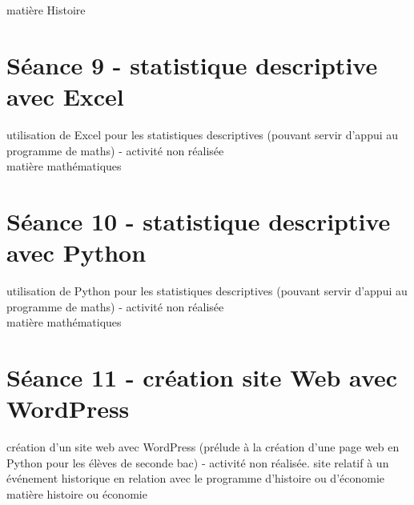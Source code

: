 \documentclass{moncours}
\begin{document}
matière Histoire


\section{Séance 9 - statistique descriptive avec Excel}

utilisation de Excel pour les statistiques descriptives (pouvant servir d'appui au programme de maths) - activité non réalisée\\

matière mathématiques

\section{Séance 10 - statistique descriptive avec Python}

utilisation de Python pour les statistiques descriptives (pouvant servir d'appui au programme de maths) - activité non réalisée\\

matière mathématiques

\section{Séance 11 - création site Web avec WordPress}

création d'un site web avec WordPress (prélude à la création d'une page web en Python pour les élèves de seconde bac) - activité non réalisée. site relatif à un événement historique en relation avec le programme d'histoire ou d'économie\\

matière histoire ou économie










\printindex %
\end{document}
